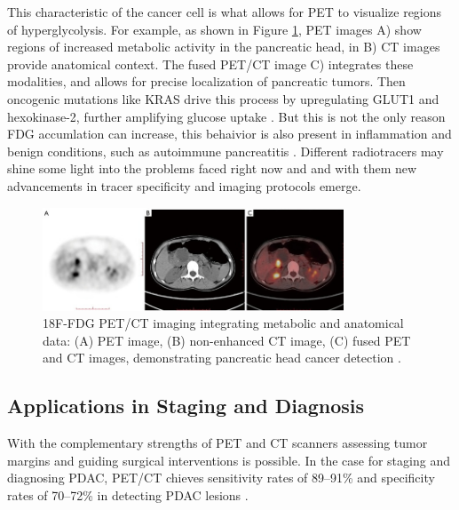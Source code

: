 \documentclass[11pt]{article} %
\begin{document}
This characteristic of the cancer cell is what allows for PET to visualize regions of hyperglycolysis. For example, as shown in Figure \ref{fig:PuFig1}, PET images A) show regions of increased metabolic activity in the pancreatic head, in B) CT images provide anatomical context. The fused PET/CT image C) integrates these modalities, and allows for precise localization of pancreatic tumors.
Then oncogenic mutations like KRAS drive this process by upregulating GLUT1 and hexokinase-2, further amplifying glucose uptake \cite{Deng2021}. But this is not the only reason FDG accumlation can increase, this behaivior is also present in inflammation and benign conditions, such as autoimmune pancreatitis \cite{Zheng2018}. Different radiotracers may shine some light into the problems faced right now and and with them new advancements in tracer specificity and imaging protocols emerge.

\begin{figure}[ht]
    \centering
    \includegraphics[width=0.8\textwidth]{assets/tcr-10-07-3560-f1.jpg}
    \caption{18F-FDG PET/CT imaging integrating metabolic and anatomical data: (A) PET image, (B) non-enhanced CT image, (C) fused PET and CT images, demonstrating pancreatic head cancer detection \cite{Pu2021}.}
    \label{fig:PuFig1}
\end{figure}

\subsection{Applications in Staging and Diagnosis}

With the complementary strengths of PET and CT scanners assessing tumor margins and guiding surgical interventions is possible. In the case for staging and diagnosing PDAC, PET/CT chieves sensitivity rates of 89–91\% and specificity rates of 70–72\% in detecting PDAC lesions \cite{TG174}.
\end{document}

